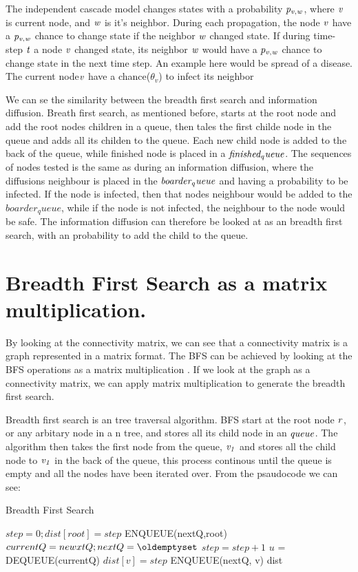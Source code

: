 The independent cascade model changes states with a probability $\it{p_{v, w}}$, where $\it{ v }$ is current node, and $\it{w}$ is it's neighbor. During each propagation, the node $\it{v}$ have a  $\it{p_{v, w}}$ chance to change state if the neighbor $\it{w}$ changed state. If during time-step $\it{t}$ a node $\it{v}$ changed state, its neighbor $\it{w}$ would have a $\it{p_{v, w}}$ chance to change state in the next time step. An example here would be spread of a disease. The current node$\it{v}$ have a chance($\theta_v$) to infect its neighbor

We can se the similarity between the breadth first search and information diffusion. Breath first search, as mentioned before, starts at the root node and add the root nodes children in a queue, then tales the first childe node in the queue and adds all its childen to the queue. Each new child node is added to the back of the queue, while finished node is placed in a $\it{finished_queue}$. The sequences of nodes tested is the same as during an information diffusion, where the diffusions neighbour is placed in the $ \it{boarder_queue} $ and having a probability to be infected. If the node is infected, then that nodes neighbour would be added to the $boarder_queue$, while if the node is not infected, the neighbour to the node would be safe. The information diffusion can therefore be looked at as an breadth first search, with an probability to add the child to the queue. 

\section{Breadth First Search as a matrix multiplication.}
By looking at the connectivity matrix, we can see that a connectivity matrix is a graph represented in a matrix format. The BFS can be achieved by looking at the BFS operations as a matrix multiplication \cite{algoToMath}. If we look at the graph as a connectivity matrix, we can apply matrix multiplication to generate the breadth first search. 

Breadth first search is an tree traversal algorithm. BFS start at the root node $\it{r}$, or any arbitary node in a n tree, and stores all its child node in an $\it{queue}$. The algorithm then takes the first node from the queue, $\it{v_1}$ and stores all the child node to $\it{v_1}$ in the back of the queue, this process continous until the queue is empty and all the nodes have been iterated over. From the psaudocode we can see:

\begin{algorithm}
\caption{Breadth First Search}
\begin{algorithmic}[1]
\State $step = 0; dist[root] = step$
\State ENQUEUE(nextQ,root)
\State $currentQ = newxtQ; nextQ = \oldemptyset$
\State $step = step+1$
\State$ u$ = DEQUEUE(currentQ)
\State $dist[v] = step$
\State ENQUEUE(nextQ, v)
\EndIf
\EndFor
\EndWhile
\EndWhile
\Return dist
\end{algorithmic}
\end{algorithm}

